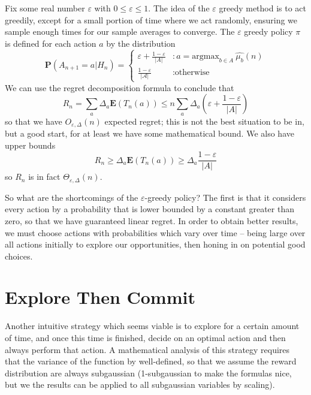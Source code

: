 Fix some real number $\varepsilon$ with $0 \leq \varepsilon \leq 1$. The idea of the $\varepsilon$ greedy method is to act greedily, except for a small portion of time where we act randomly, ensuring we sample enough times for our sample averages to converge. The $\varepsilon$ greedy policy $\pi$ is defined for each action $a$ by the distribution
%
\[ \mathbf{P}(A_{n+1} = a | H_n)  =
        \begin{cases} \varepsilon + \frac{1 - \varepsilon}{|A|} &: a = \text{argmax}_{b \in A}\ \widehat{\mu_b}(n)\\
        \frac{1 - \varepsilon}{|\mathcal{A}|} &: \text{otherwise}
        \end{cases} \]
%
We can use the regret decomposition formula to conclude that
%
\[ R_n = \sum_a \Delta_a \mathbf{E}(T_n(a)) \leq n \sum_a \Delta_a \left( \varepsilon + \frac{1 - \varepsilon}{|A|} \right) \]
%
so that we have $O_{\varepsilon, \Delta}(n)$ expected regret; this is not the best situation to be in, but a good start, for at least we have some mathematical bound. We also have upper bounds
%
\[ R_n \geq \Delta_a \mathbf{E}(T_n(a)) \geq \Delta_a \frac{1 - \varepsilon}{|A|} \]
%
so $R_n$ is in fact $\Theta_{\varepsilon, \Delta}(n)$.

So what are the shortcomings of the $\varepsilon$-greedy policy? The first is that it considers every action by a probability that is lower bounded by a constant greater than zero, so that we have guaranteed linear regret. In order to obtain better results, we must choose actions with probabilities which vary over time -- being large over all actions initially to explore our opportunities, then honing in on potential good choices.

\section{Explore Then Commit}

Another intuitive strategy which seems viable is to explore for a certain amount of time, and once this time is finished, decide on an optimal action and then always perform that action. A mathematical analysis of this strategy requires that the variance of the function by well-defined, so that we assume the reward distribution are always subgaussian (1-subgaussian to make the formulas nice, but we the results can be applied to all subgaussian variables by scaling).

